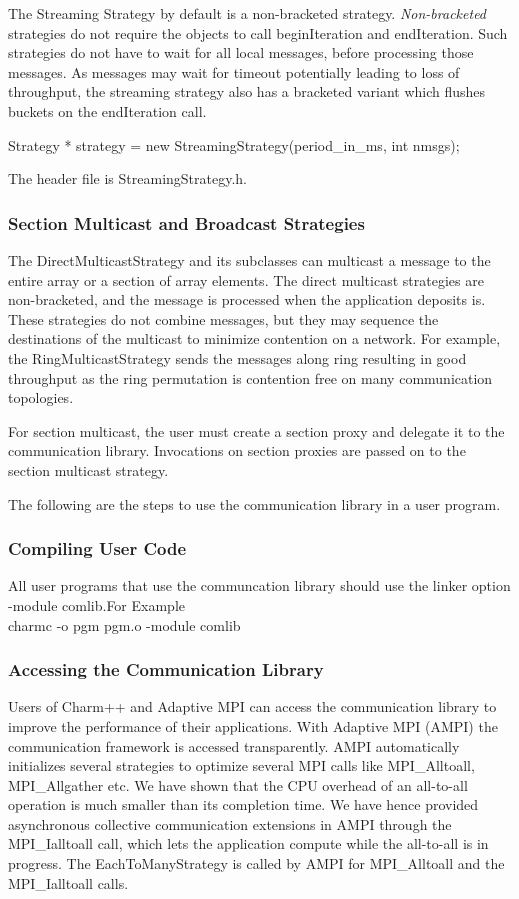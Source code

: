 The Streaming Strategy by default is a non-bracketed strategy. {\em
Non-bracketed} strategies do not require the objects to call
beginIteration and endIteration. Such strategies do not have to wait
for all local messages, before processing those messages. As messages
may wait for timeout potentially leading to loss of throughput, the
streaming strategy also has a bracketed variant which flushes buckets
on the endIteration call.

Strategy * strategy = new StreamingStrategy(period\_in\_ms, int nmsgs);

The header file is StreamingStrategy.h.

\subsubsection{Section Multicast and Broadcast Strategies}

The DirectMulticastStrategy and its subclasses can multicast a message to the entire
array or a section of array elements. The direct multicast strategies
are non-bracketed, and the message is processed when the application
deposits is. These strategies do not combine messages, but they may
sequence the destinations of the multicast to minimize contention on a
network. For example, the RingMulticastStrategy sends the messages
along ring resulting in good throughput as the ring permutation is
contention free on many communication topologies.

For section multicast, the user must create a section proxy and
delegate it to the communication library. Invocations on section
proxies are passed on to the section multicast strategy.

The following are the steps to use the communication library 
in a user program.

\subsubsection{Compiling User Code}

All user programs that use the communcation library should use the
linker option -module comlib.For Example \\ 
charmc -o pgm pgm.o -module comlib

\subsubsection{Accessing the Communication Library}

Users of Charm++ and Adaptive MPI can access the communication library
to improve the performance of their applications. With Adaptive MPI
(AMPI) the communication framework is accessed transparently. AMPI
automatically initializes several strategies to optimize several MPI
calls like MPI\_Alltoall, MPI\_Allgather etc. We have shown that the CPU
overhead of an all-to-all operation is much smaller than its
completion time. We have hence provided asynchronous collective
communication extensions in AMPI through the MPI\_Ialltoall call,
which lets the application compute while the all-to-all is in
progress. The EachToManyStrategy is called by AMPI for MPI\_Alltoall
and the MPI\_Ialltoall calls.

